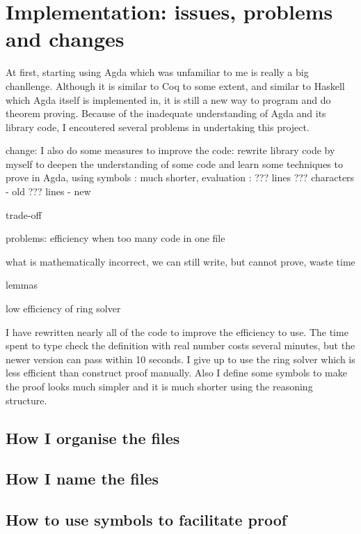 \section{Implementation: issues, problems and changes}

At first, starting using Agda which was unfamiliar to me is really a big chanllenge. Although it is similar to Coq to some extent, and similar to Haskell which Agda itself is implemented in, it is still a new way to program and do theorem proving. Because of the inadequate understanding of Agda and its library code, I encoutered several problems in undertaking this project.





change: I also do some measures to improve the code: rewrite library code by myself to deepen the understanding of some code and learn some techniques to prove in Agda,
using symbols : much shorter, evaluation : ??? lines ??? characters - old ??? lines - new

trade-off


problems: efficiency when too many code in one file

what is mathematically incorrect, we can still write, but cannot prove, waste time

lemmas

low efficiency of ring solver

I have rewritten nearly all of the code to improve the efficiency to use. The time spent to type check the definition with real number costs several minutes, but the newer version can pass within 10 seconds.
I give up to use the ring solver which is less efficient than construct proof manually. Also I define some symbols to make the proof looks much simpler and it is much shorter using the reasoning structure.


\subsection{How I organise the files}

\subsection{How I name the files}

\subsection{How to use symbols to facilitate proof}
